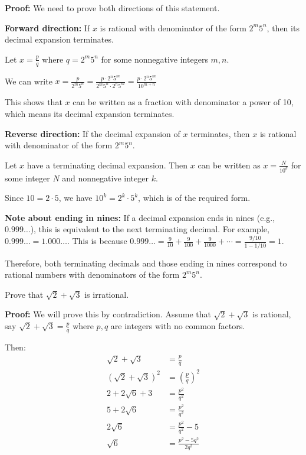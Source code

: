 \textbf{Proof:}
We need to prove both directions of this statement.

\textbf{Forward direction:} If $x$ is rational with denominator of the form $2^m 5^n$, then its decimal expansion terminates.

Let $x = \frac{p}{q}$ where $q = 2^m 5^n$ for some nonnegative integers $m, n$.

We can write $x = \frac{p}{2^m 5^n} = \frac{p \cdot 2^n 5^m}{2^m 5^n \cdot 2^n 5^m} = \frac{p \cdot 2^n 5^m}{10^{m+n}}$

This shows that $x$ can be written as a fraction with denominator a power of 10, which means its decimal expansion terminates.

\textbf{Reverse direction:} If the decimal expansion of $x$ terminates, then $x$ is rational with denominator of the form $2^m 5^n$.

Let $x$ have a terminating decimal expansion. Then $x$ can be written as $x = \frac{N}{10^k}$ for some integer $N$ and nonnegative integer $k$.

Since $10 = 2 \cdot 5$, we have $10^k = 2^k \cdot 5^k$, which is of the required form.

\textbf{Note about ending in nines:}
If a decimal expansion ends in nines (e.g., $0.999\ldots$), this is equivalent to the next terminating decimal. For example, $0.999\ldots = 1.000\ldots$. This is because $0.999\ldots = \frac{9}{10} + \frac{9}{100} + \frac{9}{1000} + \cdots = \frac{9/10}{1 - 1/10} = 1$.

Therefore, both terminating decimals and those ending in nines correspond to rational numbers with denominators of the form $2^m 5^n$.

\begin{problembox}
Prove that $\sqrt{2} + \sqrt{3}$ is irrational.
\end{problembox}

\textbf{Proof:}
We will prove this by contradiction. Assume that $\sqrt{2} + \sqrt{3}$ is rational, say $\sqrt{2} + \sqrt{3} = \frac{p}{q}$ where $p, q$ are integers with no common factors.

Then:
\begin{align*}
\sqrt{2} + \sqrt{3} &= \frac{p}{q} \\
(\sqrt{2} + \sqrt{3})^2 &= \left(\frac{p}{q}\right)^2 \\
2 + 2\sqrt{6} + 3 &= \frac{p^2}{q^2} \\
5 + 2\sqrt{6} &= \frac{p^2}{q^2} \\
2\sqrt{6} &= \frac{p^2}{q^2} - 5 \\
\sqrt{6} &= \frac{p^2 - 5q^2}{2q^2}
\end{align*}

